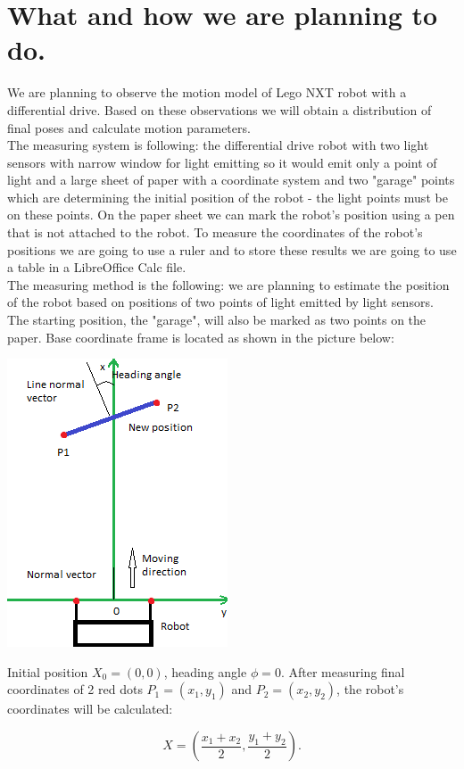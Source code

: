 \documentclass[a4paper, 12pt]{article}
\begin{document}
\section{What and how we are planning to do.}
We are planning to observe the motion model of Lego NXT robot with a differential drive. Based on these observations we will obtain a distribution of final poses and calculate motion parameters.\\
The measuring system is following: the differential drive robot with two light sensors with narrow window for light emitting so it would emit only a point of light and a large sheet of paper with a coordinate system and two "garage" points which are determining the initial position of the robot - the light points must be on these points. On the paper sheet we can mark the robot's position using a pen that is not attached to the robot. To measure the coordinates of the robot's positions we are going to use a ruler and to store these results we are going to use a table in a LibreOffice Calc file.\\
The measuring method is the following: we are planning to estimate the position of the robot based on positions of two points of light emitted by light sensors. The starting position, the "garage", will also be marked as two points on the paper. 
Base coordinate frame is located as shown in the picture below:
\begin{center}
\includegraphics[scale =1]{frame.png}
\end{center}
Initial position $X_0 = (0,0)$, heading angle $\phi = 0$. After measuring final coordinates of 2 red dots $P_1 = (x_1,y_1)$ and $P_2=(x_2,y_2)$, the robot's coordinates will be calculated:

\begin{equation}
X = (\frac{x_1+x_2}{2},\frac{y_1+y_2}{2}).
\end{equation}
\end{document}
